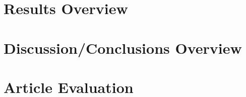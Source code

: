 \documentclass[
10pt, %
letterpaper, %
twocolumn, %
landscape %
]{article}
\begin{document}
\section{Results Overview}




\section{Discussion/Conclusions Overview}




\section*{Article Evaluation}




\renewcommand{\refname}{Reference} %


\end{document}
